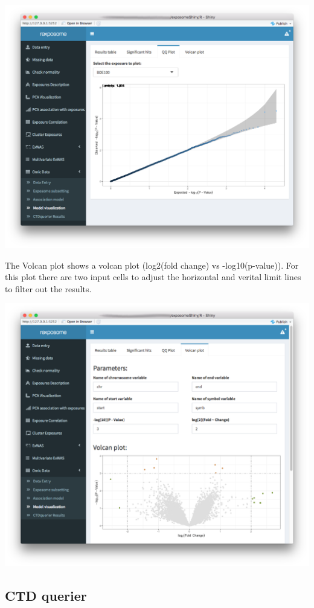 \documentclass[
]{book}
\begin{document}
\includegraphics{images/analysis9_7.png}

The Volcan plot shows a volcan plot (log2(fold change) vs -log10(p-value)). For this plot there are two input cells to adjust the horizontal and verital limit lines to filter out the results.

\includegraphics{images/analysis9_8.png}

\hypertarget{ctd-querier}{%
\subsection{CTD querier}\label{ctd-querier}}
\end{document}

